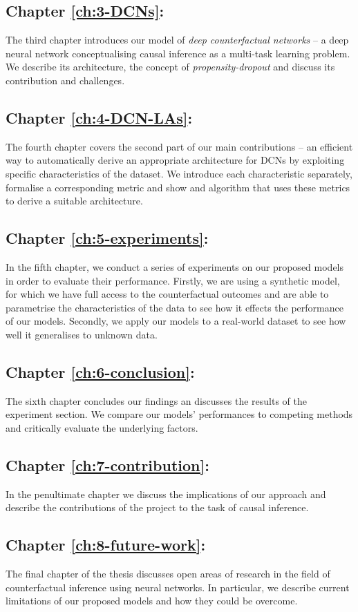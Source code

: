 \subsection*{Chapter \ref{ch:3-DCNs}: }
The third chapter introduces our model of \emph{deep counterfactual networks} -- a deep neural network conceptualising causal inference as a multi-task learning problem. We describe its architecture, the concept of \emph{propensity-dropout} and discuss its contribution and challenges. 

\subsection*{Chapter \ref{ch:4-DCN-LAs}: }
The fourth chapter covers the second part of our main contributions -- an efficient way to automatically derive an appropriate architecture for DCNs by exploiting specific characteristics of the dataset. We introduce each characteristic separately, formalise a corresponding metric and show and algorithm that uses these metrics to derive a suitable architecture. 

\subsection*{Chapter \ref{ch:5-experiments}: }
In the fifth chapter, we conduct a series of experiments on our proposed models in order to evaluate their performance. Firstly, we are using a synthetic model, for which we have full access to the counterfactual outcomes and are able to parametrise the characteristics of the data to see how it effects the performance of our models. Secondly, we apply our models to a real-world dataset to see how well it generalises to unknown data.

\subsection*{Chapter \ref{ch:6-conclusion}: }
The sixth chapter concludes our findings an discusses the results of the experiment section. We compare our models' performances to competing methods and critically evaluate the underlying factors. 

\subsection*{Chapter \ref{ch:7-contribution}: }
In the penultimate chapter we discuss the implications of our approach and describe the contributions of the project to the task of causal inference. 

\subsection*{Chapter \ref{ch:8-future-work}: }
The final chapter of the thesis discusses open areas of research in the field of counterfactual inference using neural networks. In particular, we describe current limitations of our proposed models and how they could be overcome. 
